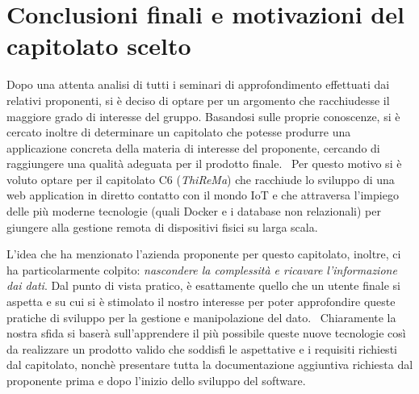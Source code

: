 \section{Conclusioni finali e motivazioni del capitolato scelto}

Dopo una attenta analisi di tutti i seminari di approfondimento effettuati dai relativi proponenti, si è deciso di optare per un argomento che racchiudesse il maggiore grado di interesse del gruppo. Basandosi sulle proprie conoscenze, si è cercato inoltre di determinare un capitolato che potesse produrre una applicazione concreta della materia di interesse del proponente, cercando di raggiungere una qualità adeguata per il prodotto finale. \ 
Per questo motivo si è voluto optare per il capitolato C6 (\textit{ThiReMa}) che racchiude lo sviluppo di una web application in diretto contatto con il mondo IoT e che attraversa l'impiego delle più moderne tecnologie (quali Docker e i database non relazionali) per giungere alla gestione remota di dispositivi fisici su larga scala. 

L'idea che ha menzionato l'azienda proponente per questo capitolato, inoltre, ci ha particolarmente colpito: \textit{nascondere la complessità e ricavare l'informazione dai dati}. Dal punto di vista pratico, è esattamente quello che un utente finale si aspetta e su cui si è stimolato il nostro interesse per poter approfondire queste pratiche di sviluppo per la gestione e manipolazione del dato. \
Chiaramente la nostra sfida si baserà sull'apprendere il più possibile queste nuove tecnologie così da realizzare un prodotto valido che soddisfi le aspettative e i requisiti richiesti dal capitolato, nonchè presentare tutta la documentazione aggiuntiva richiesta dal proponente prima e dopo l'inizio dello sviluppo del software. 

